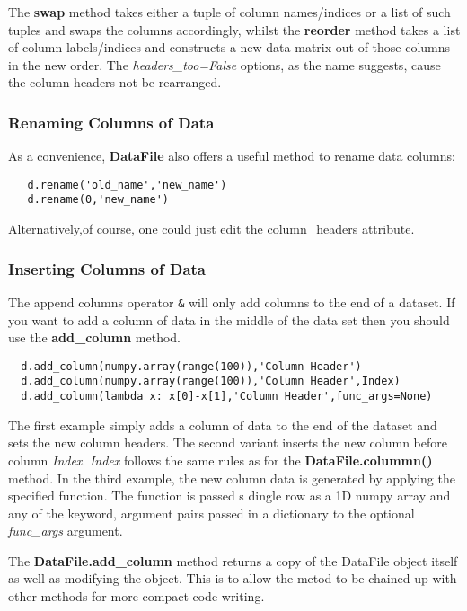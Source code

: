 \documentclass[a4paper,11pt]{scrartcl}
\begin{document}
The \textbf{swap} method takes either a tuple of column names/indices or a list of such tuples and swaps the columns accordingly, whilst the \textbf{reorder} method takes a list of column labels/indices and constructs a new data matrix out of those columns in the new order. The \textit{headers\_too=False} options, as the name suggests, cause the column headers not be rearranged.

\subsubsection{Renaming Columns of Data}
As a convenience, \textbf{DataFile} also offers a useful method to rename data columns:

\begin{lstlisting}
   d.rename('old_name','new_name')
   d.rename(0,'new_name')
\end{lstlisting}

Alternatively,of course, one could just edit the column\_headers attribute.

\subsubsection{Inserting Columns of Data}
The append columns operator \verb#&# will only add columns to the end of a
dataset. If you want to add a column of data in the middle of the data set then
you should use the \textbf{add\_column} method.

\begin{lstlisting}
  d.add_column(numpy.array(range(100)),'Column Header')
  d.add_column(numpy.array(range(100)),'Column Header',Index)
  d.add_column(lambda x: x[0]-x[1],'Column Header',func_args=None)
\end{lstlisting}

The first example simply adds a column of data to the end of the dataset and
sets the new column headers. The second variant  inserts the new column before
column \textit{Index}. \textit{Index} follows the same rules as for the
\textbf{DataFile.colummn()} method. In the third example, the new column data is
generated by applying the specified function. The function is passed s dingle
row as a 1D numpy array and any of the keyword, argument pairs passed in a
dictionary to the optional \textit{func\_args} argument.

The \textbf{DataFile.add\_column} method returns a copy of the DataFile object
itself as well as modifying the object. This is to allow the metod to be chained
up with other methods for more compact code writing.
\end{document}
